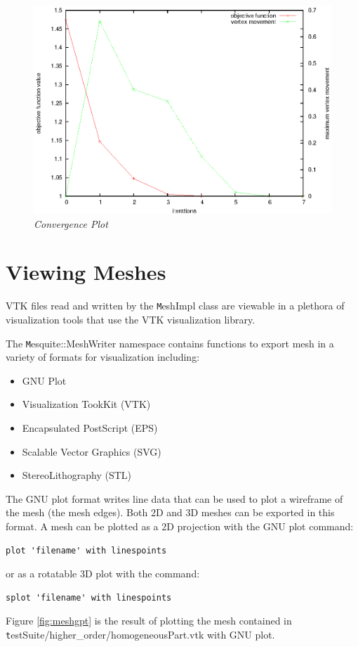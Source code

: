 \begin{figure}[htb!]
\begin{center}
\includegraphics[width=5in]{iterplot}
\caption{\em Convergence Plot \label{fig:iterplot}}
\end{center}
\end{figure}

\section{Viewing Meshes}

VTK files read and written by the {\texttt MeshImpl} class are viewable in a plethora of visualization tools that use the VTK visualization library.  

The {\texttt Mesquite::MeshWriter} namespace contains functions to export mesh in a variety of formats for visualization including:
\begin{itemize}
\item GNU Plot
\item Visualization TookKit (VTK)
\item Encapsulated PostScript (EPS)
\item Scalable Vector Graphics (SVG)
\item StereoLithography (STL)
\end{itemize}
The GNU plot format writes line data that can be used to plot a wireframe of the mesh (the mesh edges).  Both 2D and 3D meshes can be exported in this format.  A mesh can be plotted as a 2D projection with the GNU plot command:
\begin{verbatim}
plot 'filename' with linespoints
\end{verbatim}
or as a rotatable 3D plot with the command:
\begin{verbatim}
splot 'filename' with linespoints
\end{verbatim}
Figure \ref{fig:meshgpt} is the result of plotting the mesh contained in {\texttt testSuite/higher\_order/homogeneousPart.vtk} with GNU plot.

